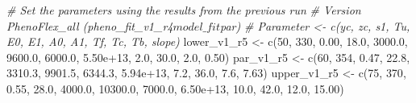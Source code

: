 \documentclass[
]{article}
\newenvironment{Shaded}{\begin{snugshade}}{\end{snugshade}}
\newcommand{\CommentTok}[1]{\textcolor[rgb]{0.56,0.35,0.01}{\textit{#1}}}
\newcommand{\DecValTok}[1]{\textcolor[rgb]{0.00,0.00,0.81}{#1}}
\newcommand{\FloatTok}[1]{\textcolor[rgb]{0.00,0.00,0.81}{#1}}
\newcommand{\FunctionTok}[1]{\textcolor[rgb]{0.00,0.00,0.00}{#1}}
\newcommand{\NormalTok}[1]{#1}
\newcommand{\OtherTok}[1]{\textcolor[rgb]{0.56,0.35,0.01}{#1}}
\begin{document}
\begin{Shaded}
\begin{Highlighting}[]
\CommentTok{\# Set the parameters using the results from the previous run}
\CommentTok{\# Version PhenoFlex\_all (pheno\_fit\_v1\_r4$model\_fit$par)}
\CommentTok{\# Parameter \textless{}{-} c(yc,  zc,   s1,   Tu,     E0,      E1,     A0,       A1,   Tf,   Tc,   Tb, slope)}
\NormalTok{lower\_v1\_r5 }\OtherTok{\textless{}{-}} \FunctionTok{c}\NormalTok{(}\DecValTok{50}\NormalTok{, }\DecValTok{330}\NormalTok{, }\FloatTok{0.00}\NormalTok{, }\FloatTok{18.0}\NormalTok{, }\FloatTok{3000.0}\NormalTok{,  }\FloatTok{9600.0}\NormalTok{, }\FloatTok{6000.0}\NormalTok{, }\FloatTok{5.50e+13}\NormalTok{,  }\FloatTok{2.0}\NormalTok{, }\FloatTok{30.0}\NormalTok{,  }\FloatTok{2.0}\NormalTok{,  }\FloatTok{0.50}\NormalTok{)}
\NormalTok{par\_v1\_r5   }\OtherTok{\textless{}{-}} \FunctionTok{c}\NormalTok{(}\DecValTok{60}\NormalTok{, }\DecValTok{354}\NormalTok{, }\FloatTok{0.47}\NormalTok{, }\FloatTok{22.8}\NormalTok{, }\FloatTok{3310.3}\NormalTok{,  }\FloatTok{9901.5}\NormalTok{, }\FloatTok{6344.3}\NormalTok{, }\FloatTok{5.94e+13}\NormalTok{,  }\FloatTok{7.2}\NormalTok{, }\FloatTok{36.0}\NormalTok{,  }\FloatTok{7.6}\NormalTok{,  }\FloatTok{7.63}\NormalTok{)}
\NormalTok{upper\_v1\_r5 }\OtherTok{\textless{}{-}} \FunctionTok{c}\NormalTok{(}\DecValTok{75}\NormalTok{, }\DecValTok{370}\NormalTok{, }\FloatTok{0.55}\NormalTok{, }\FloatTok{28.0}\NormalTok{, }\FloatTok{4000.0}\NormalTok{, }\FloatTok{10300.0}\NormalTok{, }\FloatTok{7000.0}\NormalTok{, }\FloatTok{6.50e+13}\NormalTok{, }\FloatTok{10.0}\NormalTok{, }\FloatTok{42.0}\NormalTok{, }\FloatTok{12.0}\NormalTok{, }\FloatTok{15.00}\NormalTok{)}



\end{Highlighting}
\end{Shaded}
\end{document}
